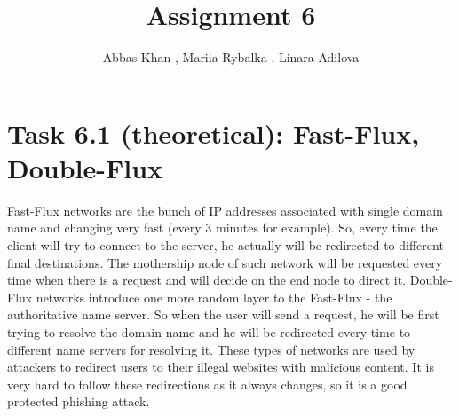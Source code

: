 \documentclass{article}
\title{Assignment 6}
\author{Abbas Khan , Mariia Rybalka , Linara Adilova}
\begin{document}
\maketitle 

\section*{Task 6.1 (theoretical): Fast-Flux, Double-Flux}
Fast-Flux networks are the bunch of IP addresses associated with single domain name and changing very fast (every 3 minutes for example). So, every time the client will try to connect to the server, he actually will be redirected to different final destinations. The mothership node of such network will be requested every time when there is a request and will decide on the end node to direct it. Double-Flux networks introduce one more random layer to the Fast-Flux - the authoritative name server. So when the user will send a request, he will be first trying to resolve the domain name and he will be redirected every time to different name servers for resolving it. These types of networks are used by attackers to redirect users to their illegal websites with malicious content. It is very hard to follow these redirections as it always changes, so it is a good protected phishing attack. \cite{flux} 
\end{document}
